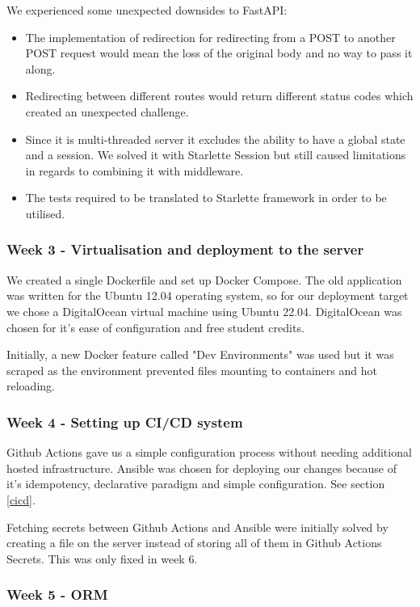 \documentclass{article}
\begin{document}
We experienced some unexpected downsides to FastAPI:
\begin{itemize}
    \item The implementation of redirection for redirecting from a POST to another POST request would mean the loss of the original body and no way to pass it along. 
    \item Redirecting between different routes would return different status codes which created an unexpected challenge.
    \item Since it is multi-threaded server it excludes the ability to have a global state and a session. We solved it with Starlette Session but still caused limitations in regards to combining it with middleware.
    \item The tests required to be translated to Starlette framework in order to be utilised.
\end{itemize}

\subsubsection{Week 3 - Virtualisation and deployment to the server}

We created a single Dockerfile and set up Docker Compose. The old application was written for the Ubuntu 12.04 operating system, so for our deployment target we chose a DigitalOcean virtual machine using Ubuntu 22.04. DigitalOcean was chosen for it's ease of configuration and free student credits.

Initially, a new Docker feature called "Dev Environments" was used but it was  scraped as the environment prevented files mounting to containers and hot reloading.


\subsubsection{Week 4 - Setting up CI/CD system }

Github Actions gave us a simple configuration process without needing additional hosted infrastructure. Ansible was chosen for deploying our changes because of it's idempotency, declarative paradigm and simple configuration.
See section \ref{cicd}. 

Fetching secrets between Github Actions and Ansible were initially solved by creating a file on the server instead of storing all of them in Github Actions Secrets. This was only fixed in week 6.

\subsubsection{Week 5 - ORM }
\end{document}
